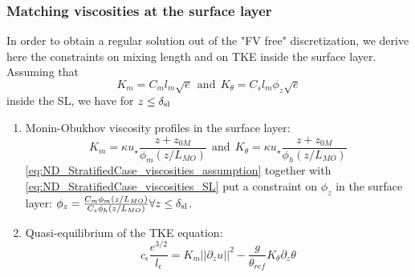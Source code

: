 \subsubsection{Matching viscosities at the surface layer}
\label{sec:ND_StratifiedCase_mixing_lengths_match}
In order to obtain a regular solution out of the "FV free"
discretization, we derive here the constraints on mixing length
and on TKE inside the surface layer.
Assuming that 
\begin{equation}
	\label{eq:ND_StratifiedCase_viscosities_assumption}
K_m = C_m l_m \sqrt{e} ~~\text{and}~~
K_\theta = C_s l_m \phi_z \sqrt{e}
\end{equation}
 inside the SL, we have
for $z\leq \delta_{\rm sl}$
\begin{enumerate}
\item
	Monin-Obukhov viscosity profiles in the surface layer:
\begin{equation}
	\label{eq:ND_StratifiedCase_viscosities_SL}
	K_m = \kappa u_\star\frac{z+ z_{0M}}{\phi_m(z/L_{MO})} ~~\text{and}~~
K_\theta = \kappa u_\star\frac{z+ z_{0M}}{\phi_h(z/L_{MO})}
\end{equation}
\eqref{eq:ND_StratifiedCase_viscosities_assumption}
together with \eqref{eq:ND_StratifiedCase_viscosities_SL} put
a constraint on $\phi_z$ in the surface layer:
$\phi_z = \frac{C_m\phi_m(z/L_{MO})}{C_s\phi_h(z/L_{MO})}
		\forall z\leq \delta_{\rm sl}$.
\item Quasi-equilibrium of the TKE equation:
\begin{equation}
	\label{eq:ND_StratifiedCase_TKE_quasi_equilibrium}
	c_\epsilon \frac{e^{3/2}}{l_\epsilon}=K_m ||\partial_z u||^2 - \frac{g}{\theta_{ref}} K_\theta \partial_z \theta
\end{equation}
\end{enumerate}
